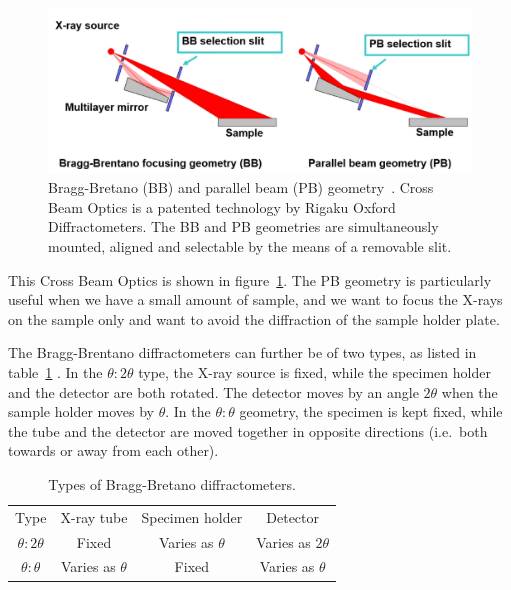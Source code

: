 	\begin{figure}
		\centering
		\includegraphics[width=\textwidth]{cross_beam_optics.png}
		\caption{\label{fig:cross_beam_optics}Bragg-Bretano (BB) and parallel beam (PB) geometry~\cite{Chowdhury2022}. Cross Beam Optics is a patented technology by Rigaku Oxford Diffractometers. The BB and PB geometries are simultaneously mounted, aligned and selectable by the means of a removable slit.}
	\end{figure}
	
	This Cross Beam Optics is shown in figure~\ref{fig:cross_beam_optics}. The PB geometry is particularly useful when we have a small amount of sample, and we want to focus the X-rays on the sample only and want to avoid the diffraction of the sample holder plate.
	
	 The Bragg-Brentano diffractometers can further be of two types, as listed in table~\ref{tab:bragg_bretano}
	 . In the $\theta : 2\theta$ type, the X-ray source is fixed, while the specimen holder and the detector are both rotated. The detector moves by an angle $2\theta$ when the sample holder moves by $\theta.$ In the $\theta : \theta$ geometry, the specimen is kept fixed, while the tube and the detector are moved together in opposite directions (i.e.\ both towards or away from each other).
	 
	\begin{table}
	
		\centering
		
		\caption{\label{tab:bragg_bretano}Types of Bragg-Bretano diffractometers.}
		\begin{tabular}{|c|c|c|c|}
		
			\hline
			
			Type & X-ray tube & Specimen holder & Detector \\
			
			\hhline{|=|=|=|=|}
			
			$\theta : 2\theta$ & Fixed & Varies as $\theta$ & Varies as $2\theta$ \\
			
			\hline
			
			$\theta : \theta$ & Varies as $\theta$ & Fixed & Varies as $\theta$ \\
			
			\hline
		
		\end{tabular}
	\end{table}
	

